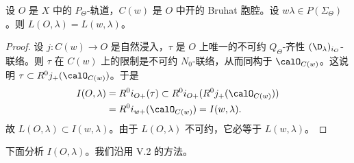 \begin{proposition}\label{prop:06.2.3}
设 $O$ 是 $X$ 中的 $P_\Theta$-轨道，$C(w)$ 是 $O$ 中开的 Bruhat 胞腔。设 $w\lambda\in P(\Sigma_\Theta)$。则 $L(O,\lambda)=L(w,\lambda)$。
\end{proposition}

\begin{proof}
设 $j:C(w)\to O$ 是自然浸入，$\tau$ 是 $O$ 上唯一的不可约 $Q_\Theta$-齐性 $(\D_\lambda)_{i_O}$-联络。则 $\tau$ 在 $C(w)$ 上的限制是不可约 $N_0$-联络，从而同构于 $\calO_{C(w)}$。这说明 $\tau\subset R^0j_+(\calO_{C(w)})$。于是
\begin{align*}
I(O,\lambda)&=R^0i_{O+}(\tau)\subset R^0i_{O+}(R^0j_+(\calO_{C(w)}))\\
&=R^0i_{w+}(\calO_{C(w)})=I(w,\lambda).
\end{align*}
故 $L(O,\lambda)\subset I(w,\lambda)$。由于 $L(O,\lambda)$ 不可约，它必等于 $L(w,\lambda)$。
\end{proof}

下面分析 $I(O,\lambda)$。我们沿用 V.2 的方法。

